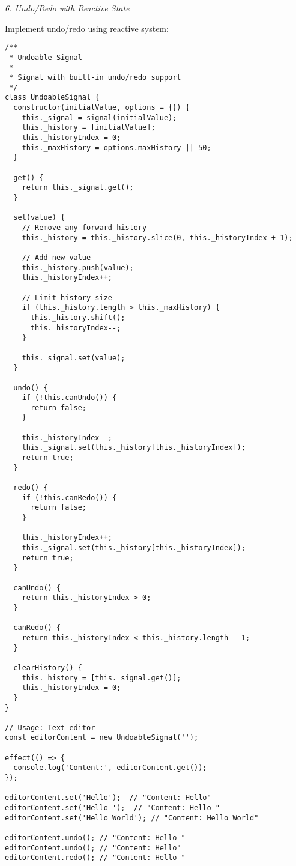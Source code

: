 \documentclass[11pt]{article}
\begin{document}
\emph{6. Undo/Redo with Reactive State}

Implement undo/redo using reactive system:

\begin{verbatim}
/**
 * Undoable Signal
 * 
 * Signal with built-in undo/redo support
 */
class UndoableSignal {
  constructor(initialValue, options = {}) {
    this._signal = signal(initialValue);
    this._history = [initialValue];
    this._historyIndex = 0;
    this._maxHistory = options.maxHistory || 50;
  }
  
  get() {
    return this._signal.get();
  }
  
  set(value) {
    // Remove any forward history
    this._history = this._history.slice(0, this._historyIndex + 1);
    
    // Add new value
    this._history.push(value);
    this._historyIndex++;
    
    // Limit history size
    if (this._history.length > this._maxHistory) {
      this._history.shift();
      this._historyIndex--;
    }
    
    this._signal.set(value);
  }
  
  undo() {
    if (!this.canUndo()) {
      return false;
    }
    
    this._historyIndex--;
    this._signal.set(this._history[this._historyIndex]);
    return true;
  }
  
  redo() {
    if (!this.canRedo()) {
      return false;
    }
    
    this._historyIndex++;
    this._signal.set(this._history[this._historyIndex]);
    return true;
  }
  
  canUndo() {
    return this._historyIndex > 0;
  }
  
  canRedo() {
    return this._historyIndex < this._history.length - 1;
  }
  
  clearHistory() {
    this._history = [this._signal.get()];
    this._historyIndex = 0;
  }
}

// Usage: Text editor
const editorContent = new UndoableSignal('');

effect(() => {
  console.log('Content:', editorContent.get());
});

editorContent.set('Hello');  // "Content: Hello"
editorContent.set('Hello ');  // "Content: Hello "
editorContent.set('Hello World'); // "Content: Hello World"

editorContent.undo(); // "Content: Hello "
editorContent.undo(); // "Content: Hello"
editorContent.redo(); // "Content: Hello "
\end{verbatim}
\end{document}
